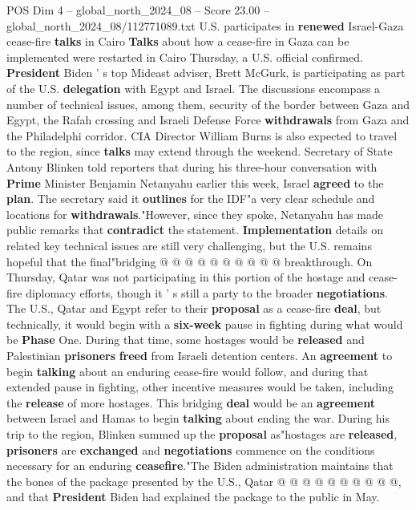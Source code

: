 \begin{textsample}{POS Dim 4 – global\_north\_2024\_08 – Score 23.00 – global\_north\_2024\_08/112771089.txt}  \label{ex:f4_pos_165}
U.S. participates in \textbf{renewed} Israel-Gaza cease-fire \textbf{talks} in Cairo \textbf{Talks} about how a cease-fire in Gaza can be implemented were restarted in Cairo Thursday, a U.S. official confirmed. \textbf{President} Biden ' s top Mideast adviser, Brett McGurk, is participating as part of the U.S. \textbf{delegation} with Egypt and Israel.
The discussions encompass a number of technical issues, among them, security of the border between Gaza and Egypt, the Rafah crossing and Israeli Defense Force \textbf{withdrawals} from Gaza and the Philadelphi corridor.
CIA Director William Burns is also expected to travel to the region, since \textbf{talks} may extend through the weekend.
Secretary of State Antony Blinken told reporters that during his three-hour conversation with \textbf{Prime} Minister Benjamin Netanyahu earlier this week, Israel \textbf{agreed} to the \textbf{plan}.
The secretary said it \textbf{outlines} for the IDF"a very clear schedule and locations for \textbf{withdrawals}."However, since they spoke, Netanyahu has made public remarks that \textbf{contradict} the statement. \textbf{Implementation} details on related key technical issues are still very challenging, but the U.S. remains hopeful that the final"bridging @ @ @ @ @ @ @ @ @ @ breakthrough.
On Thursday, Qatar was not participating in this portion of the hostage and cease-fire diplomacy efforts, though it ' s still a party to the broader \textbf{negotiations}.
The U.S., Qatar and Egypt refer to their \textbf{proposal} as a cease-fire \textbf{deal}, but technically, it would begin with a \textbf{six-week} pause in fighting during what would be \textbf{Phase} One.
During that time, some hostages would be \textbf{released} and Palestinian \textbf{prisoners} \textbf{freed} from Israeli detention centers.
An \textbf{agreement} to begin \textbf{talking} about an enduring cease-fire would follow, and during that extended pause in fighting, other incentive measures would be taken, including the \textbf{release} of more hostages.
This bridging \textbf{deal} would be an \textbf{agreement} between Israel and Hamas to begin \textbf{talking} about ending the war.
During his trip to the region, Blinken summed up the \textbf{proposal} as"hostages are \textbf{released}, \textbf{prisoners} are \textbf{exchanged} and \textbf{negotiations} commence on the conditions necessary for an enduring \textbf{ceasefire}."The Biden administration maintains that the bones of the package presented by the U.S., Qatar @ @ @ @ @ @ @ @ @ @, and that \textbf{President} Biden had explained the package to the public in May.

\end{textsample}
